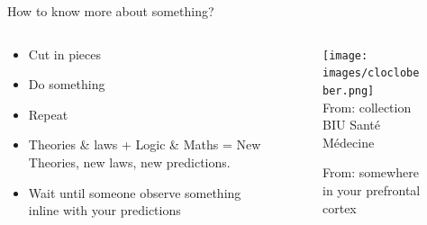 \documentclass[10pt, notes=show]{beamer}
\begin{document}
\begin{frame}{}
        \textcolor{tracblue}{\large How to know more about something?}
        \vspace{1cm}
    \begin{columns}

        \begin{column}{0.6\linewidth}
            \begin{itemize}
                \item<3-> Cut in pieces
                \item<4-> Do something
                \item<5-> Repeat
            \end{itemize}

            \begin{itemize}
                \item<7-> Theories \& laws + Logic \& Maths = New  Theories, new laws, new predictions.
                \item<8-> Wait until someone observe something inline with your predictions 
            \end{itemize}


        \end{column}
        \begin{column}{0.3\linewidth}

            {
                \begin{figure}[h]
                    \centering
                    \texttt{[image: images/cloclobeber.png]}\\
                    {\tiny From: collection BIU Santé Médecine}
                \end{figure}
            }
            {
                \begin{figure}[h]
                    \centering
                    {\tiny From: somewhere in your prefrontal cortex}
                \end{figure}
            }


        \end{column}

    \end{columns}

\end{frame}
\end{document}
